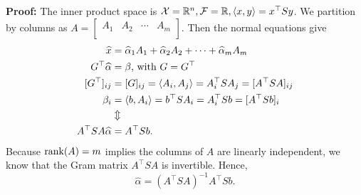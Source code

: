 \textbf{Proof:} The inner product space is $ \mathcal{X}= \mathbb R^n, \mathcal{F}=\mathbb R, \langle x, y \rangle = x^\top Sy $. We partition by columns as $A= \left[\begin{array}{cccc} A_1 & A_2 & \cdots & A_m\\ \end{array}\right]$. Then the normal equations give 
    \begin{align*}
        \widehat{x}&=\widehat{\alpha}_1 A_1 + \widehat{\alpha}_2 A_2 + \cdots + \widehat{\alpha}_m A_m\\
        G^\top \widehat{\alpha}&=\beta \textnormal{, with } G = G^\top\\
        [G^\top]_{ij}&=[G]_{ij}=\langle A_i, A_j \rangle=A_i^\top SA_j=[A^\top SA]_{ij}\\
        \beta_i&=\langle b, A_i \rangle=b^\top SA_i=A_i^\top Sb=[A^\top Sb]_i\\
        & \Updownarrow \\
        A^\top SA \widehat{\alpha}& =A^\top Sb.
    \end{align*}
Because $\mathrm{rank}(A)=m$ implies the columns of $A$ are linearly independent, we know that the Gram matrix $ A^\top SA $ is invertible. Hence, 
    \begin{equation*}
     \widehat{\alpha}=(A^\top SA)^{-1}A^\top Sb.
    \end{equation*}
    
    \Qed

